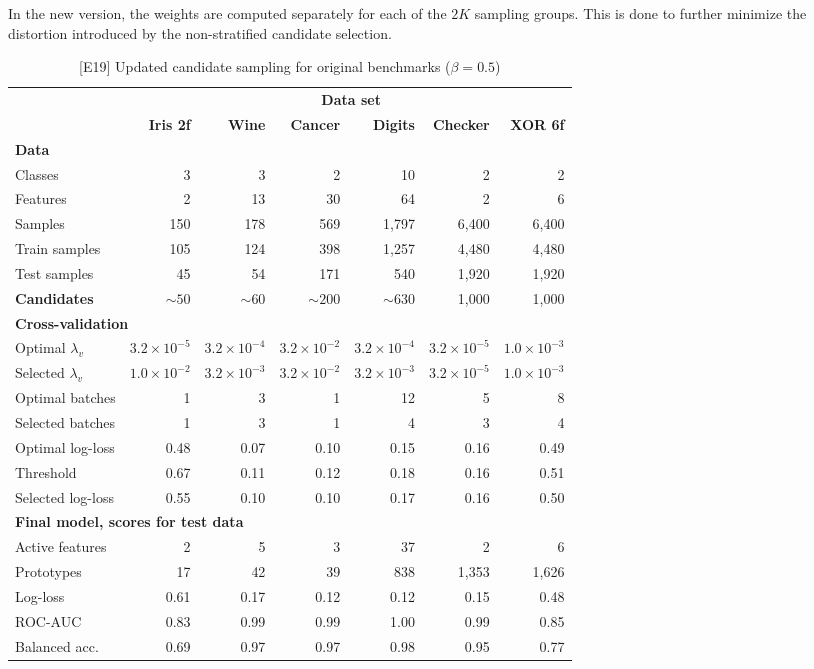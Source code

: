 In the new version, the weights are computed separately for each of the $2K$ sampling groups.
This is done to further minimize the distortion introduced by the non-stratified candidate selection.\par
%
\begin{table}
\caption{[E19] Updated candidate sampling for original benchmarks ($\beta=0.5$)}
\label{tab_e19}
%
\begin{center}
\small
\begin{tabular}{|lrrrrrr|}
\hline
&\multicolumn{6}{c|}{\textbf{\hrulefill\ Data set \hrulefill}}\\
&\textbf{Iris 2f}&\textbf{Wine}&\textbf{Cancer}&\textbf{Digits}&\textbf{Checker}&\textbf{XOR 6f}\\
\multicolumn{7}{|l|}{\textbf{Data}}\\
Classes&3&3&2&10&2&2\\
Features&2&13&30&64&2&6\\
Samples&150&178&569&1,797&6,400&6,400\\
Train samples&105&124&398&1,257&4,480&4,480\\
Test samples&45&54&171&540&1,920&1,920\\
\textbf{Candidates}&$\sim50$&$\sim60$&$\sim200$&$\sim630$&1,000&1,000\\
\multicolumn{7}{|l|}{\textbf{Cross-validation}}\\
Optimal $\lambda_v$&$3.2\times10^{-5}$&$3.2\times10^{-4}$&$3.2\times10^{-2}$&$3.2\times10^{-4}$&$3.2\times10^{-5}$&$1.0\times10^{-3}$\\
Selected $\lambda_v$&$1.0\times10^{-2}$&$3.2\times10^{-3}$&$3.2\times10^{-2}$&$3.2\times10^{-3}$&$3.2\times10^{-5}$&$1.0\times10^{-3}$\\
Optimal batches&1&3&1&12&5&8\\
Selected batches&1&3&1&4&3&4\\
Optimal log-loss&0.48&0.07&0.10&0.15&0.16&0.49\\
Threshold&0.67&0.11&0.12&0.18&0.16&0.51\\
Selected log-loss&0.55&0.10&0.10&0.17&0.16&0.50\\
\multicolumn{7}{|l|}{\textbf{Final model, scores for test data}}\\
Active features&2&5&3&37&2&6\\
Prototypes&17&42&39&838&1,353&1,626\\
Log-loss&0.61&0.17&0.12&0.12&0.15&0.48\\
ROC-AUC&0.83&0.99&0.99&1.00&0.99&0.85\\
Balanced acc.&0.69&0.97&0.97&0.98&0.95&0.77\\
\hline
\end{tabular}
\end{center}
\end{table}
